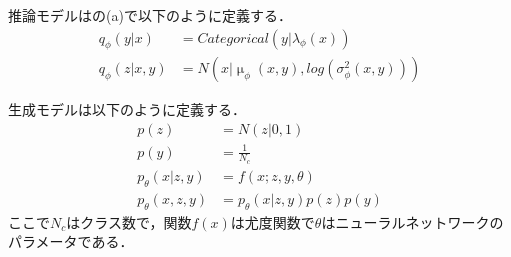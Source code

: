 推論モデルはの(a)で以下のように定義する．
\begin{align}\label{eq:m2_discriminative}
q_\phi (y | x) & = Categorical(y | \lambda_\phi (x)) \\
q_\phi (z | x, y) & = N(x | \upmu_\phi(x, y), log(\sigma_\phi^2 (x, y)))
\end{align}

生成モデルは以下のように定義する．
\begin{align}\label{eq:m2_generative}
p(z) & = N (z| 0, 1)  \\
p(y) & = \frac{1}{N_c} \\
p_\theta (x|z, y) & = f(x; z, y, \theta) \\
p_\theta (x, z, y) & = p_\theta (x|z, y) p(z) p(y)
\end{align}
ここで$N_c$はクラス数で，関数$f(x)$は尤度関数で$\theta$はニューラルネットワークのパラメータである．